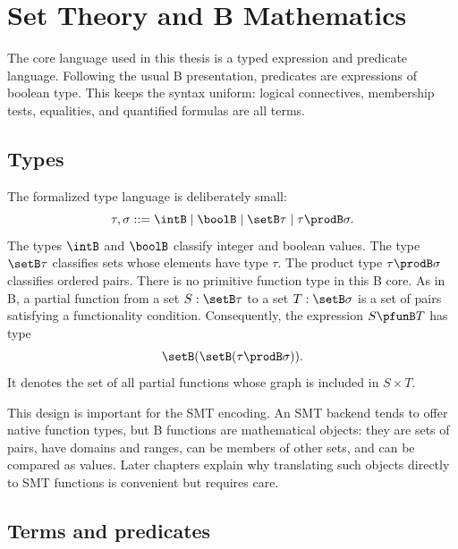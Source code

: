 \section{Set Theory and B Mathematics}
\label{sec:set-theory-b-mathematics}
\label{sec:b-core-language}

The core language used in this thesis is a typed expression and predicate language.
Following the usual B presentation, predicates are expressions of boolean type.
This keeps the syntax uniform: logical connectives, membership tests, equalities, and quantified formulas are all terms.

\subsection{Types}

The formalized type language is deliberately small:
\[
  \tau, \sigma ::= \intB
  \mid \boolB
  \mid \setB \tau
  \mid \tau \prodB \sigma.
\]
The types \(\intB\) and \(\boolB\) classify integer and boolean values.
The type \(\setB \tau\) classifies sets whose elements have type \(\tau\).
The product type \(\tau \prodB \sigma\) classifies ordered pairs.
There is no primitive function type in this B core.
As in B, a partial function from a set \(S : \setB \tau\) to a set \(T : \setB \sigma\) is a set of pairs satisfying a functionality condition.
Consequently, the expression \(S \pfunB T\) has type
\[
  \setB(\setB(\tau \prodB \sigma)).
\]
It denotes the set of all partial functions whose graph is included in \(S \times T\).

This design is important for the SMT encoding.
An SMT backend tends to offer native function types, but B functions are mathematical objects: they are sets of pairs, have domains and ranges, can be members of other sets, and can be compared as values.
Later chapters explain why translating such objects directly to SMT functions is convenient but requires care.

\subsection{Terms and predicates}

